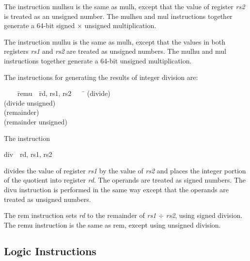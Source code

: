 \documentclass[11pt, twoside, pdftex]{article}
\newenvironment{ctabbing}%
{\begin{center}\begin{minipage}{\textwidth}\begin{tabbing}}
{\end{tabbing}\end{minipage}\end{center}}
\begin{document}
The instruction {\sf mulhsu} is the same as {\sf mulh}, except that the value of register
{\it rs2} is treated as an unsigned number.  The {\sf mulhsu} and {\sf mul} instructions 
together generate a 64-bit signed $\times$ unsigned multiplication.
 
The instruction {\sf mulhu} is the same as {\sf mulh}, except that the values in both
registers {\it rs1} and {\it rs2} are treated as unsigned numbers.  The {\sf mulhu} and
{\sf mul} instructions together generate a 64-bit unsigned multiplication.

\newpage
The instructions for generating the results of integer division are:
\vspace{-\baselineskip}
\begin{ctabbing}
~~~~\={\sf remu}~~\={\sf rd, rs1, rs2}~~~~\=\kill
{} \>(divide)\\
 \>(divide unsigned)\\
 \>(remainder)\\
 \>(remainder unsigned)
\end{ctabbing}

\noindent
The instruction
\vspace{-\baselineskip}
\begin{center}
{\sf div~~rd, rs1, rs2}
\end{center}
\noindent
divides the value of register {\it rs1} by the value of {\it rs2} and places the integer
portion of the quotient into register {\it rd}. The operands are treated as signed numbers.
The {\sf divu} instruction is performed in the same way except that the operands are treated 
as unsigned numbers.

The {\sf rem} instruction sets {\it rd} to the remainder of {\it rs1} $\div$ {\it rs2},
using signed division. The {\sf remu} instruction is the same as {\sf rem}, except using unsigned
division.

\subsection{Logic Instructions}
\end{document}
